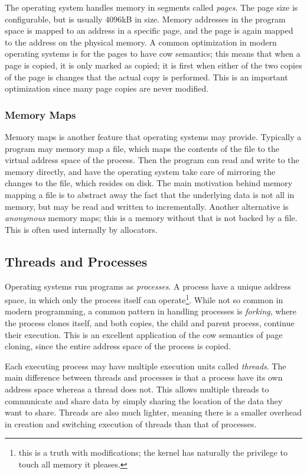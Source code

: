 The operating system handles memory in segments called \emph{pages}. The page size is configurable,
but is usually 4096kB in size. Memory addresses in the program space is mapped to an address in a
specific page, and the page is again mapped to the address on the physical memory.
A common optimization in modern operating systems is for the pages to have \gls{cow} semantics;
this means that when a page is copied, it is only marked as copied; it is first when either of the
two copies of the page is changes that the actual copy is performed. This is an important
optimization since many page copies are never modified.


\subsubsection{Memory Maps\label{sec:memory-map}}

Memory maps is another feature that operating systems may provide. Typically a program may memory
map a file, which maps the contents of the file to the virtual address space of the process. Then
the program can read and write to the memory directly, and have the operating system take care of
mirroring the changes to the file, which resides on disk.  The main motivation behind memory
mapping a file is to abstract away the fact that the underlying data is not all in memory, but may
be read and written to incrementally. Another alternative is \emph{anonymous} memory maps; this is
a memory without that is not backed by a file. This is often used internally by allocators.

\subsection{Threads and Processes}

Operating systems run programs as \emph{processes}. A process have a unique address space, in which
only the process itself can operate\footnote{this is a truth with modifications; the kernel has
naturally the privilege to touch all memory it pleases.}.  While not so common in modern
programming, a common pattern in handling processes is \emph{forking}, where the process clones
itself, and both copies, the child and parent process, continue their execution. This is an
excellent application of the \gls{cow} semantics of page cloning, since the entire address space of
the process is copied.

Each executing process may have multiple execution units called \emph{threads}. The main difference
between threads and processes is that a process have its own address space whereas a thread does
not. This allows multiple threads to communicate and share data by simply sharing the location of
the data they want to share. Threads are also much lighter, meaning there is a smaller overhead in
creation and switching execution of threads than that of processes.


